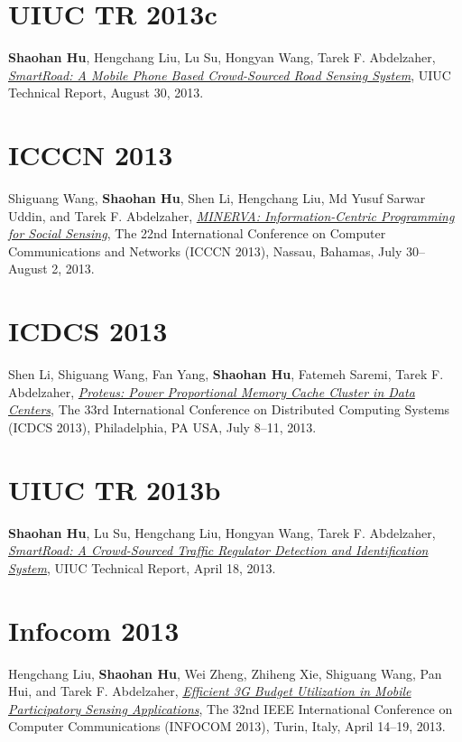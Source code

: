 \section{\sc UIUC TR 2013c}\hypertarget{hu2013uiuc2}{} \textbf{Shaohan Hu}, Hengchang Liu, Lu Su, Hongyan Wang, Tarek F. Abdelzaher, \href{https://www.ideals.illinois.edu/handle/2142/45699}{\emph{SmartRoad: A Mobile Phone Based Crowd-Sourced Road Sensing System}}, \textsf{UIUC Technical Report}, August 30, 2013.

\section{\sc ICCCN 2013}\hypertarget{wang2013icccn}{} Shiguang Wang, \textbf{Shaohan Hu}, Shen Li, Hengchang Liu, Md Yusuf Sarwar Uddin, and Tarek F. Abdelzaher, \href{http://ieeexplore.ieee.org/xpls/abs_all.jsp?arnumber=6614152}{\emph{MINERVA: Information-Centric Programming for Social Sensing}}, \textsf{The 22nd International Conference on Computer Communications and Networks (ICCCN 2013)}, Nassau, Bahamas, July 30--August 2, 2013.

\section{\sc ICDCS 2013}\hypertarget{li2013icdcs}{} Shen Li, Shiguang Wang, Fan Yang, \textbf{Shaohan Hu}, Fatemeh Saremi, Tarek F. Abdelzaher, \href{http://ieeexplore.ieee.org/xpl/articleDetails.jsp?arnumber=6681577}{\emph{Proteus: Power Proportional Memory Cache Cluster in Data Centers}}, \textsf{The 33rd International Conference on Distributed Computing Systems (ICDCS 2013)}, Philadelphia, PA USA, July 8--11, 2013.

\section{\sc UIUC TR 2013b}\hypertarget{hu2013uiuc1}{} \textbf{Shaohan Hu}, Lu Su, Hengchang Liu, Hongyan Wang, Tarek F. Abdelzaher, \href{https://www.ideals.illinois.edu/handle/2142/43856}{\emph{SmartRoad: A Crowd-Sourced Traffic Regulator Detection and Identification System}}, \textsf{UIUC Technical Report}, April 18, 2013.

\section{\sc Infocom 2013}\hypertarget{liu2013infocom}{} Hengchang Liu, \textbf{Shaohan Hu}, Wei Zheng, Zhiheng Xie, Shiguang Wang, Pan Hui, and Tarek F. Abdelzaher, \href{http://ieeexplore.ieee.org/xpl/articleDetails.jsp?arnumber=6566935}{\emph{Efficient 3G Budget Utilization in Mobile Participatory Sensing Applications}}, \textsf{The 32nd IEEE International Conference on Computer Communications (INFOCOM 2013)}, Turin, Italy, April 14--19, 2013.

